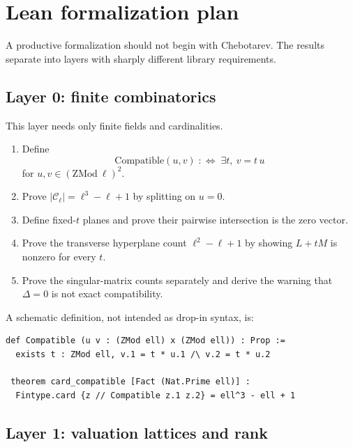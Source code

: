 \documentclass[11pt,oneside]{article}
\theoremstyle{definition}
\theoremstyle{remark}
\begin{document}
\section{Lean formalization plan}\label{sec:lean}

A productive formalization should not begin with Chebotarev.  The results
separate into layers with sharply different library requirements.

\subsection{Layer 0: finite combinatorics}

This layer needs only finite fields and cardinalities.

\begin{enumerate}
\item Define
\[
 \mathrm{Compatible}(u,v)\;:\!\Longleftrightarrow\;
 \exists t,\ v=t\,u
\]
for $u,v\in(\mathrm{ZMod}\ \ell)^2$.
\item Prove $|\mathcal C_\ell|=\ell^3-\ell+1$ by splitting on $u=0$.
\item Define fixed-$t$ planes and prove their pairwise intersection is the
zero vector.
\item Prove the transverse hyperplane count $\ell^2-\ell+1$ by showing
$L+tM$ is nonzero for every $t$.
\item Prove the singular-matrix counts separately and derive the warning that
$\Delta=0$ is not exact compatibility.
\end{enumerate}

A schematic definition, not intended as drop-in syntax, is:

\begin{lstlisting}[caption={Lean-shaped statement of exact compatibility}]
def Compatible (u v : (ZMod ell) x (ZMod ell)) : Prop :=
  exists t : ZMod ell, v.1 = t * u.1 /\ v.2 = t * u.2

 theorem card_compatible [Fact (Nat.Prime ell)] :
  Fintype.card {z // Compatible z.1 z.2} = ell^3 - ell + 1
\end{lstlisting}

\subsection{Layer 1: valuation lattices and rank}
\end{document}
